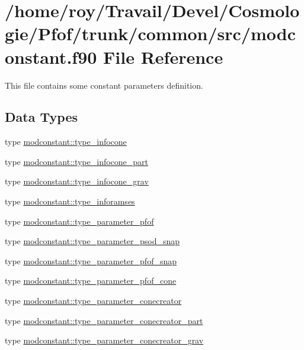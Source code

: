 \hypertarget{modconstant_8f90}{}\section{/home/roy/\+Travail/\+Devel/\+Cosmologie/\+Pfof/trunk/common/src/modconstant.f90 File Reference}
\label{modconstant_8f90}


This file contains some constant parameters definition.  


\subsection*{Data Types}
\begin{DoxyCompactItemize}
\item 
type \hyperlink{structmodconstant_1_1type__infocone}{modconstant\+::type\+\_\+infocone}
\item 
type \hyperlink{structmodconstant_1_1type__infocone__part}{modconstant\+::type\+\_\+infocone\+\_\+part}
\item 
type \hyperlink{structmodconstant_1_1type__infocone__grav}{modconstant\+::type\+\_\+infocone\+\_\+grav}
\item 
type \hyperlink{structmodconstant_1_1type__inforamses}{modconstant\+::type\+\_\+inforamses}
\item 
type \hyperlink{structmodconstant_1_1type__parameter__pfof}{modconstant\+::type\+\_\+parameter\+\_\+pfof}
\item 
type \hyperlink{structmodconstant_1_1type__parameter__psod__snap}{modconstant\+::type\+\_\+parameter\+\_\+psod\+\_\+snap}
\item 
type \hyperlink{structmodconstant_1_1type__parameter__pfof__snap}{modconstant\+::type\+\_\+parameter\+\_\+pfof\+\_\+snap}
\item 
type \hyperlink{structmodconstant_1_1type__parameter__pfof__cone}{modconstant\+::type\+\_\+parameter\+\_\+pfof\+\_\+cone}
\item 
type \hyperlink{structmodconstant_1_1type__parameter__conecreator}{modconstant\+::type\+\_\+parameter\+\_\+conecreator}
\item 
type \hyperlink{structmodconstant_1_1type__parameter__conecreator__part}{modconstant\+::type\+\_\+parameter\+\_\+conecreator\+\_\+part}
\item 
type \hyperlink{structmodconstant_1_1type__parameter__conecreator__grav}{modconstant\+::type\+\_\+parameter\+\_\+conecreator\+\_\+grav}
\end{DoxyCompactItemize}

